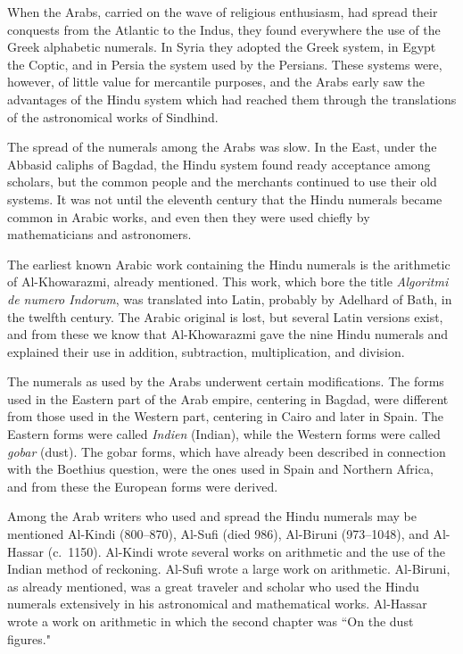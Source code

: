 \documentclass[11pt,a4paper]{article}
\begin{document}
When the Arabs, carried on the wave of religious enthusiasm, had spread their conquests from the Atlantic to the Indus, they found everywhere the use of the Greek alphabetic numerals. In Syria they adopted the Greek system, in Egypt the Coptic, and in Persia the system used by the Persians. These systems were, however, of little value for mercantile purposes, and the Arabs early saw the advantages of the Hindu system which had reached them through the translations of the astronomical works of Sindhind.

The spread of the numerals among the Arabs was slow. In the East, under the Abbasid caliphs of Bagdad, the Hindu system found ready acceptance among scholars, but the common people and the merchants continued to use their old systems. It was not until the eleventh century that the Hindu numerals became common in Arabic works, and even then they were used chiefly by mathematicians and astronomers.

The earliest known Arabic work containing the Hindu numerals is the arithmetic of Al-Khowarazmi, already mentioned. This work, which bore the title \textit{Algoritmi de numero Indorum}, was translated into Latin, probably by Adelhard of Bath, in the twelfth century. The Arabic original is lost, but several Latin versions exist, and from these we know that Al-Khowarazmi gave the nine Hindu numerals and explained their use in addition, subtraction, multiplication, and division.

The numerals as used by the Arabs underwent certain modifications. The forms used in the Eastern part of the Arab empire, centering in Bagdad, were different from those used in the Western part, centering in Cairo and later in Spain. The Eastern forms were called \textit{Indien} (Indian), while the Western forms were called \textit{gobar} (dust). The gobar forms, which have already been described in connection with the Boethius question, were the ones used in Spain and Northern Africa, and from these the European forms were derived.

Among the Arab writers who used and spread the Hindu numerals may be mentioned Al-Kindi (800--870), Al-Sufi (died 986), Al-Biruni (973--1048), and Al-Hassar (c.~1150). Al-Kindi wrote several works on arithmetic and the use of the Indian method of reckoning. Al-Sufi wrote a large work on arithmetic. Al-Biruni, as already mentioned, was a great traveler and scholar who used the Hindu numerals extensively in his astronomical and mathematical works. Al-Hassar wrote a work on arithmetic in which the second chapter was ``On the dust figures."
\end{document}
